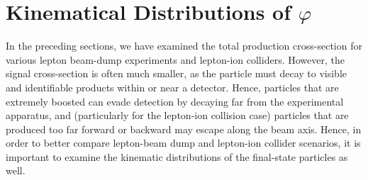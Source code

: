 \section{Kinematical Distributions of $\varphi$}\label{sec:phi_kin}
In the preceding sections, we have examined the total production cross-section for various lepton beam-dump experiments and lepton-ion colliders. However, the signal cross-section is often much smaller, as the particle must decay to visible and identifiable products within or near a detector. Hence, particles that are extremely boosted can evade detection by decaying far from the experimental apparatus, and (particularly for the lepton-ion collision case) particles that are produced too far forward or backward may escape along the beam axis. Hence, in order to better compare lepton-beam dump and lepton-ion collider scenarios, it is important to examine the kinematic distributions of the final-state particles as well. 

